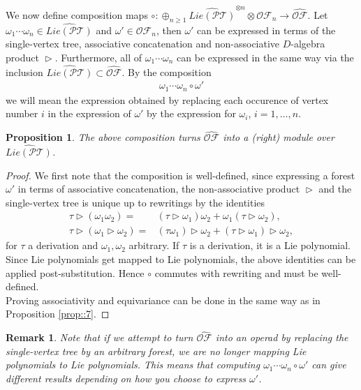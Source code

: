\documentclass[10pt,a4paper]{article}
\newtheorem{proposition}[theorem]{Proposition}
\newtheorem{remark}{Remark}
\DeclareMathOperator{\graft}{\triangleright}
\begin{document}
We now define composition maps $\circ :\oplus_{n\geq 1} \widehat{Lie(\mathcal{PT})}^{\otimes n} \otimes \mathcal{OF}_n \to \widehat{\mathcal{OF}}$. Let $\omega_1 \cdots \omega_n \in \widehat{Lie(\mathcal{PT})}$ and $\omega' \in \mathcal{OF}_n$, then $\omega'$ can be expressed in terms of the single-vertex tree, associative concatenation and non-associative $D$-algebra product $\graft$. Furthermore, all of $\omega_1 \cdots \omega_n$ can be expressed in the same way via the inclusion $\widehat{Lie(\mathcal{PT})} \subset \widehat{\mathcal{OF}}$. By the composition
\begin{align*}
\omega_1 \cdots \omega_n \circ \omega'
\end{align*}
we will mean the expression obtained by replacing each occurence of vertex number $i$ in the expression of $\omega'$ by the expression for $\omega_i$, $i=1,\dots,n$.

\begin{proposition}
The above composition turns $\widehat{\mathcal{OF}}$ into a (right) module over $\widehat{Lie(\mathcal{PT})}$.
\end{proposition}
\begin{proof}
We first note that the composition is well-defined, since expressing a forest $\omega'$ in terms of associative concatenation, the non-associative product $\graft$ and the single-vertex tree is unique up to rewritings by the identities
\begin{align*}
\tau \graft (\omega_1\omega_2)=&(\tau\graft \omega_1)\omega_2 + \omega_1(\tau \graft \omega_2), \\
\tau \graft (\omega_1 \graft \omega_2)=&(\tau \omega_1)\graft \omega_2 + (\tau \graft \omega_1) \graft \omega_2,
\end{align*}
for $\tau$ a derivation and $\omega_1,\omega_2$ arbitrary. If $\tau$ is a derivation, it is a Lie polynomial. Since Lie polynomials get mapped to Lie polynomials, the above identities can be applied post-substitution. Hence $\circ$ commutes with rewriting and must be well-defined. \\
Proving associativity and equivariance can be done in the same way as in Proposition \ref{prop::7}.
\end{proof}

\begin{remark}
Note that if we attempt to turn $\widehat{\mathcal{OF}}$ into an operad by replacing the single-vertex tree by an arbitrary forest, we are no longer mapping Lie polynomials to Lie polynomials. This means that computing $\omega_1 \cdots \omega_n \circ \omega'$ can give different results depending on how you choose to express $\omega'$.
\end{remark}
\end{document}
